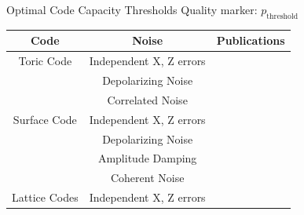 \documentclass{dfki}
\begin{document}
\begin{frame}{Optimal Code Capacity Thresholds}
	Quality marker: $p_{\text{threshold}}$
	\begin{table}[h]
        \renewcommand{\arraystretch}{1.5} %
        \small
		\begin{tabular}{c|c|c}
			\textbf{Code} & \textbf{Noise} & \textbf{Publications} \\
			\hline
			Toric Code & Independent X, Z errors & \cite{merz_two-dimensional_2001, honecker_nishimori_2001} \\
			 & Depolarizing Noise & \cite{bombin_strong_2012} \\
			 & Correlated Noise & \cite{chubb_statistical_2019}\\
			\hline
			Surface Code & Independent X, Z errors & \cite{bravyi_efficient_2014} \\
			& Depolarizing Noise & \cite{bravyi_efficient_2014} \\
			& Amplitude Damping & \cite{darmawan_tensor-network_2017} \\
			& Coherent Noise & \cite{behrends_statistical_2024, bao_phases_2024} \\
			\hline
			Lattice Codes & Independent X, Z errors & \cite{fujii_error-_2012} \\
		\end{tabular}
	\end{table}
\end{frame}
\end{document}
